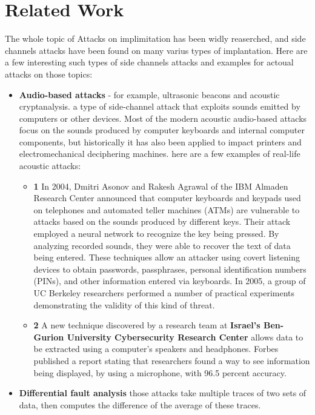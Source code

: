 \section{Related Work} \label{sec:RelatedWork}
The whole topic of Attacks on implimitation has been widly reaserched,
and side channels attacks have been found on many varius types of implantation.
Here are a few interesting such types of side channels attacks
 and examples for actoual attacks on those topics:
\begin{itemize}
    \item \textbf{Audio-based attacks} - for example, ultrasonic beacons and acoustic cryptanalysis. 
    a type of side-channel attack that exploits sounds emitted by computers or other devices.
    Most of the modern acoustic audio-based attacks focus on the sounds produced by computer keyboards and internal computer components,
    but historically it has also been applied to impact printers and electromechanical deciphering machines.
    here are a few examples of real-life acoustic attacks: 
    \begin{itemize}
        \item \textbf{1} In 2004, Dmitri Asonov and Rakesh Agrawal of the IBM Almaden Research Center announced that computer keyboards and keypads used on telephones and automated teller machines (ATMs) are vulnerable to attacks based on the sounds produced by different keys.
         Their attack employed a neural network to recognize the key being pressed.
         By analyzing recorded sounds, they were able to recover the text of data being entered.
         These techniques allow an attacker using covert listening devices to obtain passwords, passphrases, personal identification numbers (PINs), and other information entered via keyboards.
         In 2005, a group of UC Berkeley researchers performed a number of practical experiments demonstrating the validity of this kind of threat.
        \item \textbf{2} A new technique discovered by a research team at \textbf{Israel's Ben-Gurion University Cybersecurity Research Center} 
        allows data to be extracted using a computer's speakers and headphones. 
        Forbes published a report stating that researchers found a way to see information being displayed, by using a microphone, with 96.5 percent accuracy.
    \end{itemize}
    \item \textbf{Differential fault analysis} those attacks take multiple traces of two sets of data, then computes the difference of the average of these traces.

\end{itemize}
